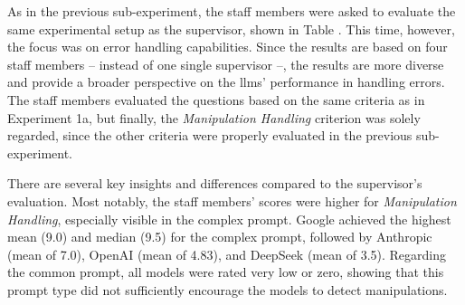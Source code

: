 
As in the previous sub-experiment, the staff members were asked to evaluate the same experimental setup as the supervisor, shown in Table . This time, however, the focus was on error handling capabilities. Since the results are based on four staff members -- instead of one single supervisor --, the results are more diverse and provide a broader perspective on the \ac{llms}' performance in handling errors. The staff members evaluated the questions based on the same criteria as in Experiment 1a, but finally, the \textit{Manipulation Handling} criterion was solely regarded, since the other criteria were properly evaluated in the previous sub-experiment. 

\begin{table}[htbp]
    \centering
    \caption{Staff-based Manipulation Handling Analysis by LLM and Prompt Type (Exp1b).}
    \label{tab:exp1b-manipulation-handling-staff}
\end{table}

\pagebreak

There are several key insights and differences compared to the supervisor's evaluation. Most notably, the staff members' scores were higher for \textit{Manipulation Handling}, especially visible in the complex prompt. Google achieved the highest mean (9.0) and median (9.5) for the complex prompt, followed by Anthropic (mean of 7.0), OpenAI (mean of 4.83), and DeepSeek (mean of 3.5). Regarding the common prompt, all models were rated very low or zero, showing that this prompt type did not sufficiently encourage the models to detect manipulations.

